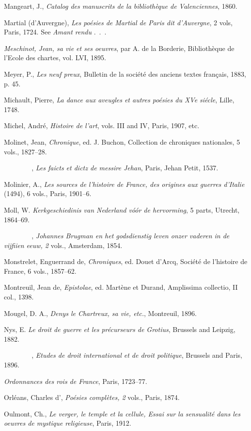 Mangeart, J., \emph{Catalog des manuscrits de la bibliothèque de
Valenciennes}, 1860.

Martial (d'Auvergne), \emph{Les poésies de Martial de Paris dit
d'Auvergne}, 2 vols, Paris, 1724. See \emph{Amant rendu} .~.~.

\emph{Meschinot, Jean, sa vie et ses oeuvres}, par A. de la Borderie,
Bibliothèque de l'Ecole des chartes, vol. LVI, 1895.

Meyer, P., \emph{Les neuf preux}, Bulletin de la société des anciens
textes français, 1883, p. 45.

Michault, Pierre, \emph{La dance aux aveugles et autres poésies du XVe
siécle}, Lille, 1748.

Michel, André, \emph{Histoire de l'art}, vols. III and IV, Paris, 1907,
etc.

Molinet, Jean, \emph{Chronique}, ed. J. Buchon, Collection de chroniques
nationales, 5 vols., 1827--28.

\emph{{~~~~~~~~}}, \emph{Les faicts et dictz de messire Jehan}, Paris,
Jehan Petit, 1537.

Molinier, A., \emph{Les sources de l'histoire de France, des origines
aux guerres d'Italie} (1494), 6 vols., Paris, 1901--6.

Moll, W. \emph{Kerkgeschiedinis van Nederland vóór de hervorming}, 5
parts, Utrecht, 1864--69.

\emph{{~~~~~~~~}}, \emph{Johannes Brugman en het godsdienstig leven
onzer vaderen in de vijfiien eeuw, 2} vols., Amsterdam, 1854.

Monstrelet, Enguerrand de, \emph{Chroniques}, ed. Douet d'Arcq, Société
de l'histoire de France, 6 vols., 1857--62.

Montreuil, Jean de, \emph{Epistolae}, ed. Martène et Durand, Amplissima
collectio, II col., 1398.

Mougel, D. A., \emph{Denys le Chartreux, sa vie, etc.}, Montreuil, 1896.

Nys, E. \emph{Le droit de guerre et les précurseurs de Grotius},
Brussels and Leipzig, 1882.

\emph{{~~~~~~~~}}, \emph{Etudes de droit international et de droit
politique}, Brussels and Paris, 1896.

\emph{Ordonnances des rois de France}, Paris, 1723--77.

Orléans, Charles d', \emph{Poésies complètes, 2} vols., Paris, 1874.

Oulmont, Ch., \emph{Le verger, le temple et la cellule, Essai sur la
sensualité dans les oeuvres de mystique religieuse}, Paris, 1912.

